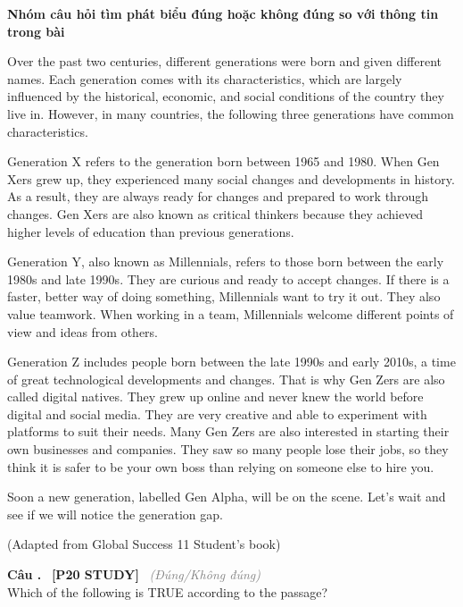 \documentclass[12pt,a4paper,twoside]{article}
\newcounter{qcounter}
\newcommand{\question}[2][]{%
    \stepcounter{qcounter}%
    \par\vspace{6pt}%
    \noindent\textcolor{primaryBlue}{\textbf{Câu \theqcounter.}}~%
    \textcolor{secondaryBlue}{\small\textbf{[P20 STUDY]}}~%
    \if\relax\detokenize{#1}\relax\else\textcolor{gray}{\small\textit{(#1)}}~\fi\\[1pt]
    \noindent #2%
}
\newenvironment{readingpassage}[1][]{%
    \begin{tcolorbox}[enhanced, colback=grayLight, colframe=secondaryBlue,
        coltitle=textDark, fonttitle=\bfseries, title={#1},
        rounded corners, arc=3mm, boxrule=1pt,
        left=15pt, right=15pt, top=10pt, bottom=10pt,
        breakable, before skip=10pt, after skip=10pt, drop fuzzy shadow]
    \setstretch{1.3}
}{\end{tcolorbox}}
\begin{document}
\setcounter{qcounter}{0}
\begin{groupbox}\textbf{\large Nhóm câu hỏi tìm phát biểu đúng hoặc không đúng so với thông tin trong bài}\end{groupbox}
\begin{readingpassage}[]
Over the past two centuries, different generations were born and given different names. Each generation comes with its characteristics, which are largely influenced by the historical, economic, and social conditions of the country they live in. However, in many countries, the following three generations have common characteristics.

Generation X refers to the generation born between 1965 and 1980. When Gen Xers grew up, they experienced many social changes and developments in history. As a result, they are always ready for changes and prepared to work through changes. Gen Xers are also known as critical thinkers because they achieved higher levels of education than previous generations.

Generation Y, also known as Millennials, refers to those born between the early 1980s and late 1990s. They are curious and ready to accept changes. If there is a faster, better way of doing something, Millennials want to try it out. They also value teamwork. When working in a team, Millennials welcome different points of view and ideas from others.

Generation Z includes people born between the late 1990s and early 2010s, a time of great technological developments and changes. That is why Gen Zers are also called digital natives. They grew up online and never knew the world before digital and social media. They are very creative and able to experiment with platforms to suit their needs. Many Gen Zers are also interested in starting their own businesses and companies. They saw so many people lose their jobs, so they think it is safer to be your own boss than relying on someone else to hire you.

Soon a new generation, labelled Gen Alpha, will be on the scene. Let’s wait and see if we will notice the generation gap.

(Adapted from Global Success 11 Student’s book)
\end{readingpassage}

\question[Đúng/Không đúng]{Which of the following is TRUE according to the passage?}
\end{document}
